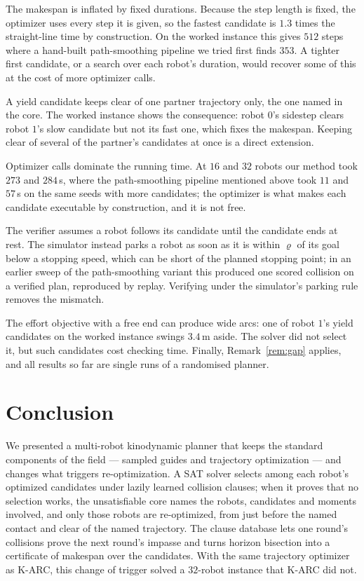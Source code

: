 \documentclass[conference]{IEEEtran}
\theoremstyle{plain}
\theoremstyle{definition}
\begin{document}
The makespan is inflated by fixed durations. Because the step length is fixed, the optimizer
uses every step it is given, so the fastest candidate is $1.3$ times the straight-line time by
construction. On the worked instance this gives $512$ steps where a hand-built
path-smoothing pipeline we tried first finds $353$. A tighter first candidate, or a search over
each robot's duration, would recover some of this at the cost of more optimizer calls.

A yield candidate keeps clear of one partner trajectory only, the one named in the core. The
worked instance shows the consequence: robot $0$'s sidestep clears robot $1$'s slow candidate but
not its fast one, which fixes the makespan. Keeping clear of several of the partner's candidates
at once is a direct extension.

Optimizer calls dominate the running time. At $16$ and $32$ robots our method took $273$ and
$284$\,s, where the path-smoothing pipeline mentioned above took $11$ and $57$\,s on the same
seeds with more candidates; the optimizer is what makes each candidate executable by
construction, and it is not free.

The verifier assumes a robot follows its candidate until the candidate ends at rest. The
simulator instead parks a robot as soon as it is within $\varrho$ of its goal below a stopping
speed, which can be short of the planned stopping point; in an earlier sweep of the
path-smoothing variant this produced one scored collision on a verified plan, reproduced by
replay. Verifying under the simulator's parking rule removes the mismatch.

The effort objective with a free end can produce wide arcs: one of robot $1$'s yield candidates
on the worked instance swings $3.4$\,m aside. The solver did not select it, but such candidates
cost checking time. Finally, Remark~\ref{rem:gap} applies, and all results so far are single
runs of a randomised planner.

\section{Conclusion}

We presented a multi-robot kinodynamic planner that keeps the standard components of the
field --- sampled guides and trajectory optimization --- and changes what triggers
re-optimization. A SAT solver selects among each robot's optimized candidates under lazily
learned collision clauses; when it proves that no selection works, the unsatisfiable core names
the robots, candidates and moments involved, and only those robots are re-optimized, from just
before the named contact and clear of the named trajectory. The clause database lets one round's
collisions prove the next round's impasse and turns horizon bisection into a certificate of
makespan over the candidates. With the same trajectory optimizer as K-ARC, this change of
trigger solved a $32$-robot instance that K-ARC did not.
\end{document}
